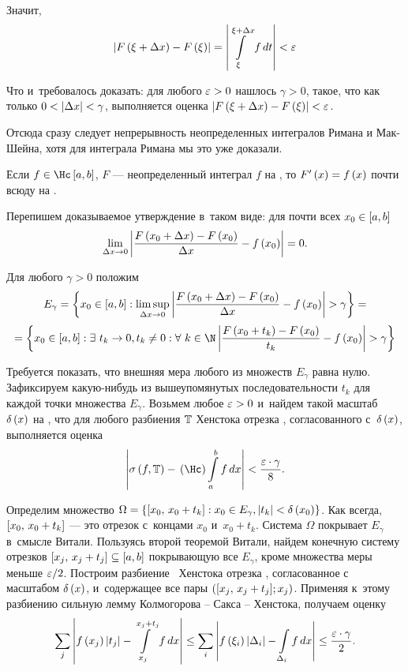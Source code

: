\documentclass[draft]{article}
\begin{document}
Значит,
$$\abs{F\at(\xi+\dx)-F\at(\xi)}=\abs{\intd[\xi,\xi+\dx]   f,t}<\ep$$

Что и~требовалось доказать: для любого $\varepsilon > 0$ нашлось
$\gamma > 0$, такое, что как только $0 < \left|\Delta x\right| < \gamma$,
выполняется оценка $\abs{F\at(\xi+\dx)-F\at(\xi)}<\ep$.

\prtm

\bigskip

{\small \rem

Отсюда сразу следует непрерывность неопределенных интегралов Римана
и Мак-Шейна, хотя для интеграла Римана мы это уже доказали.}

\bigskip


Если $f\iskurzh[a,b]$, $F$ --- неопределенный интеграл $f$ на \ab,
то $F'\atx=f\atx$ почти всюду на \ab.

\pr

Перепишем доказываемое утверждение в~таком виде: для почти всех
$x_0\in\segab$
$$\lim\limits_{\dx\rightarrow0}\abs{{F\at(x_0+\dx)-F\at(x_0)\over\dx}-f\at(x_0)}=0.$$

\eject

Для любого $\gamma > 0$ положим
$$E_\gamma=\set{x_0\in\segab:\limsup\limits_{\dx\rightarrow0}
\abs{{F\at(x_0+\dx)-F\at(x_0)\over\dx}-f\at(x_0)}>\gamma}=$$
$$=\set{x_0\in\segab:\exists\ t_k\rightarrow0,t_k\neq0:\forall\
k\in\N\abs{{F\at(x_0+t_k)-F\at(x_0)\over{t_k}}-f\at(x_0)}>\gamma}$$

Требуется показать, что внешняя мера любого из множеств $E_\gamma$
равна нулю. Зафиксируем какую-нибудь из вышеупомянутых
последовательности $t_k$ для каждой точки множества $E_\gamma$.
Возьмем любое $\varepsilon > 0$ и~найдем такой масштаб $\dex$ на \ab, что для
любого разбиения $\mathbb{T}$ Хенстока отрезка \ab, согласованного с~$\dex$,
выполняется оценка
$$\abs{\isfT-\kurzh\intabfdx}<{\ep\cdot\gamma\over8}.$$

Определим множество $\Omega=\set{\seg[x_0,\,x_0+t_k]:x_0\in
E_\gamma,\abs{t_k}<\de\at(x_0)}$. Как всегда, $\seg[x_0,\,x_0+t_k]$
--- это отрезок с~концами $x_0$ и~$x_0 + t_k$. Система $\Omega$ покрывает
$E_\gamma$ в~смысле Витали. Пользуясь второй теоремой Витали, найдем
конечную систему отрезков $\seg[x_j,\,x_j+t_j]\subseteq\segab$
покрывающую все $E_\gamma$, кроме множества меры меньше $\varepsilon/2$.
Построим разбиение \Tdixif\ Хенстока отрезка \ab, согласованное с
масштабом $\dex$, и~содержащее все пары $\pair(\seg[x_j,\,x_j+t_j];
x_j)$. Применяя к~этому разбиению сильную лемму Колмогорова -- Сакса
-- Хенстока, получаем оценку
$$\sumj\abs{f\at(x_j)\abs{t_j}-   \intd[x_j,x_j+t_j]   f,x}\le
\sumi\abs{\fxildi-\intdeifdx}\le{\ep\cdot\gamma\over2}.$$
\end{document}
